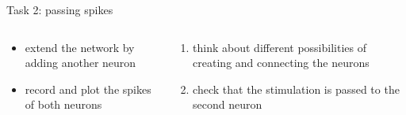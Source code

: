 \documentclass[aspectratio=169]{beamer}
\begin{document}
\begin{frame}{Task 2: passing spikes}
	\begin{columns}[onlytextwidth]
		\begin{column}{0.48\textwidth}
			\begin{center}
			\end{center}

			\begin{itemize}
				\item extend the network by adding another neuron
				\item record and plot the spikes of both neurons
			\end{itemize}
		\end{column}
		\hfill
		\begin{column}{0.48\textwidth}
			\begin{enumerate}
				\item think about different possibilities of creating and connecting the neurons
				\item check that the stimulation is passed to the second neuron
			\end{enumerate}
		\end{column}
	\end{columns}
\end{frame}
\end{document}

